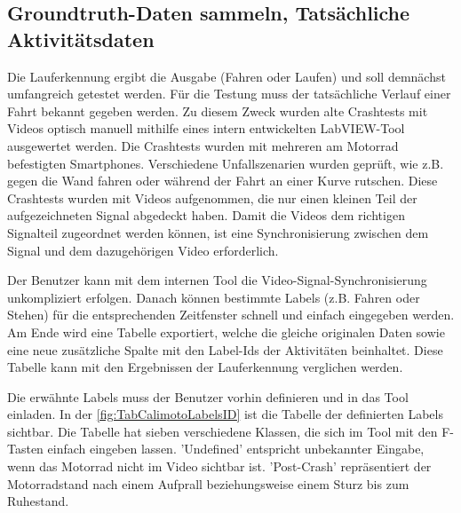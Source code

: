 \subsection{Groundtruth-Daten sammeln, Tatsächliche Aktivitätsdaten}

Die Lauferkennung ergibt die Ausgabe (Fahren oder Laufen) und soll demnächst umfangreich getestet werden. Für die Testung muss der tatsächliche Verlauf einer Fahrt bekannt gegeben werden. Zu diesem Zweck wurden alte Crashtests mit Videos optisch manuell mithilfe eines intern entwickelten LabVIEW-Tool ausgewertet werden. Die Crashtests wurden mit mehreren am Motorrad befestigten Smartphones. Verschiedene Unfallszenarien wurden geprüft, wie z.B. gegen die Wand fahren oder während der Fahrt an einer Kurve rutschen. Diese Crashtests wurden mit Videos aufgenommen, die nur einen kleinen Teil der aufgezeichneten Signal abgedeckt haben. Damit die Videos dem richtigen Signalteil zugeordnet werden können, ist eine Synchronisierung zwischen dem Signal und dem dazugehörigen Video erforderlich. 

Der Benutzer kann mit dem internen Tool die Video-Signal-Synchronisierung unkompliziert erfolgen. Danach können bestimmte Labels (z.B. Fahren oder Stehen) für die entsprechenden Zeitfenster schnell und einfach eingegeben werden. Am Ende wird eine Tabelle exportiert, welche die gleiche originalen Daten sowie eine neue zusätzliche Spalte mit den Label-Ids der Aktivitäten beinhaltet.
Diese Tabelle kann mit den Ergebnissen der Lauferkennung verglichen werden.

Die erwähnte Labels muss der Benutzer vorhin definieren und in das Tool einladen. In der \autoref{fig:TabCalimotoLabelsID} ist die Tabelle der definierten Labels sichtbar. Die Tabelle hat sieben verschiedene Klassen, die sich im Tool mit den F-Tasten einfach eingeben lassen. 'Undefined' entspricht unbekannter Eingabe, wenn das Motorrad nicht im Video sichtbar ist. 'Post-Crash' repräsentiert der Motorradstand nach einem Aufprall beziehungsweise einem Sturz bis zum Ruhestand.
 
